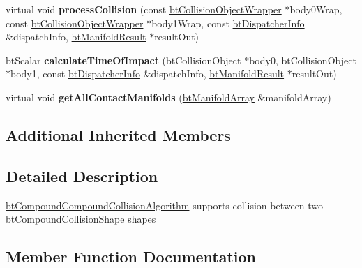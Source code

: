 \begin{DoxyCompactItemize}
\item 
\mbox{\label{classbtCompoundCompoundCollisionAlgorithm_ac5aefb45e10c07ab8acc41bb977767b6}} 
virtual void {\bfseries process\+Collision} (const \hyperlink{structbtCollisionObjectWrapper}{bt\+Collision\+Object\+Wrapper} $\ast$body0\+Wrap, const \hyperlink{structbtCollisionObjectWrapper}{bt\+Collision\+Object\+Wrapper} $\ast$body1\+Wrap, const \hyperlink{structbtDispatcherInfo}{bt\+Dispatcher\+Info} \&dispatch\+Info, \hyperlink{classbtManifoldResult}{bt\+Manifold\+Result} $\ast$result\+Out)
\item 
\mbox{\label{classbtCompoundCompoundCollisionAlgorithm_a6341a601d82d44850bea7b45f22ff971}} 
bt\+Scalar {\bfseries calculate\+Time\+Of\+Impact} (bt\+Collision\+Object $\ast$body0, bt\+Collision\+Object $\ast$body1, const \hyperlink{structbtDispatcherInfo}{bt\+Dispatcher\+Info} \&dispatch\+Info, \hyperlink{classbtManifoldResult}{bt\+Manifold\+Result} $\ast$result\+Out)
\item 
\mbox{\label{classbtCompoundCompoundCollisionAlgorithm_a67a67f1f83d8a4a9008635ba7bcf5b13}} 
virtual void {\bfseries get\+All\+Contact\+Manifolds} (\hyperlink{classbtAlignedObjectArray}{bt\+Manifold\+Array} \&manifold\+Array)
\end{DoxyCompactItemize}
\subsection*{Additional Inherited Members}


\subsection{Detailed Description}
\hyperlink{classbtCompoundCompoundCollisionAlgorithm}{bt\+Compound\+Compound\+Collision\+Algorithm} supports collision between two bt\+Compound\+Collision\+Shape shapes 

\subsection{Member Function Documentation}
\mbox{\label{classbtCompoundCompoundCollisionAlgorithm_a5fb9d60f9713c0e3795c89390353beb3}} 
